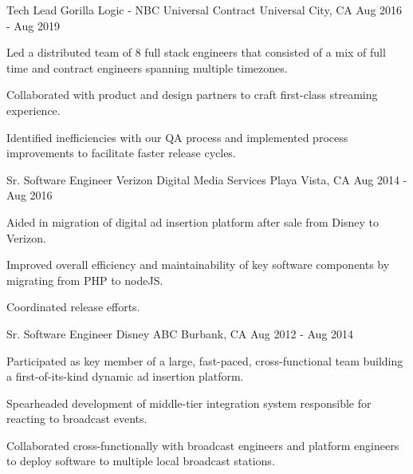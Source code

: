 \begin{cventries}
  \cventry
    {Tech Lead} %
    {Gorilla Logic - NBC Universal Contract} %
    {Universal City, CA} %
    {Aug 2016 - Aug 2019} %
    {
      \begin{cvitems} %
        \item {Led a distributed team of 8 full stack engineers that consisted of a mix of full time and contract engineers spanning multiple timezones.}
        \item {Collaborated with product and design partners to craft first-class streaming experience.}
        \item {Identified inefficiencies with our QA process and implemented process improvements to facilitate faster release cycles.}
      \end{cvitems}
    }

  \cventry
    {Sr. Software Engineer} %
    {Verizon Digital Media Services} %
    {Playa Vista, CA} %
    {Aug 2014 - Aug 2016} %
    {
      \begin{cvitems} %
        \item {Aided in migration of digital ad insertion platform after sale from Disney to Verizon.}
        \item {Improved overall efficiency and maintainability of key software components by migrating from PHP to nodeJS.}
        \item {Coordinated release efforts.}
      \end{cvitems}
    }


  \cventry
    {Sr. Software Engineer} %
    {Disney ABC} %
    {Burbank, CA} %
    {Aug 2012 - Aug 2014} %
    {
      \begin{cvitems} %
        \item {Participated as key member of a large, fast-paced, cross-functional team building a first-of-its-kind dynamic ad insertion platform.}
        \item {Spearheaded development of middle-tier integration system responsible for reacting to broadcast events.}
        \item {Collaborated cross-functionally with broadcast engineers and platform engineers to deploy software to multiple local broadcast stations.}
      \end{cvitems}
    }


\end{cventries}
